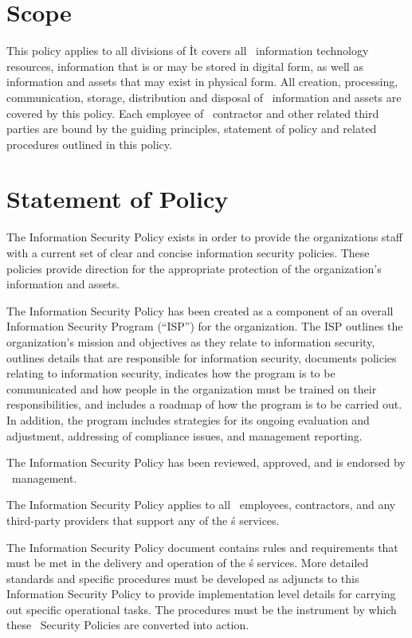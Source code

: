\documentclass[sec]{policy}
\begin{document}
	\section{Scope}
	
		This policy applies to all divisions of \theOrganization\.  It covers all \theOrganization\ information technology resources, information that is or may be stored in digital form, as well as information and assets that may exist in physical form.  All creation, processing, communication, storage, distribution and disposal of \theOrganization\ information and assets are covered by this policy.  Each employee of \theOrganization\, contractor and other related third parties are bound by the guiding principles, statement of policy and related procedures outlined in this policy. 
		
	\section{Statement of Policy}
		
		The Information Security Policy exists in order to provide the organizations staff with a current set of clear and concise information security policies.  These policies provide direction for the appropriate protection of the organization’s information and assets.
		
		The Information Security Policy has been created as a component of an overall Information Security Program (“ISP”) for the organization.  The ISP outlines the organization’s mission and objectives as they relate to information security, outlines details that are responsible for information security, documents policies relating to information security, indicates how the program is to be communicated and how people in the organization must be trained on their responsibilities, and includes a roadmap of how the program is to be carried out.  In addition, the program includes strategies for its ongoing evaluation and adjustment, addressing of compliance issues, and management reporting.
		
		The Information Security Policy has been reviewed, approved, and is endorsed by \theOrganization\ management.
		
		The Information Security Policy applies to all \theOrganization\ employees, contractors, and any third-party providers that support any of the \theOrganization\'s services.
		
		The Information Security Policy document contains rules and requirements that must be met in the delivery and operation of the \theOrganization\'s services.  More detailed standards and specific procedures must be developed as adjuncts to this Information Security Policy to provide implementation level details for carrying out specific operational tasks.  The procedures must be the instrument by which these \theOrganization\ Security Policies are converted into action.
		
\end{document}
